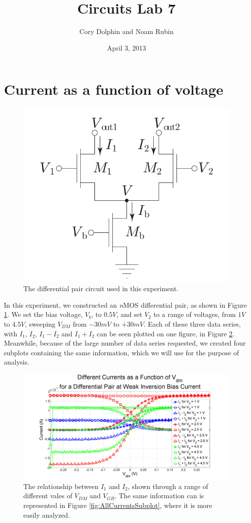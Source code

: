 \documentclass{article}
\title{Circuits Lab 7}
\author{Cory Dolphin and Noam Rubin}
\date{April 3, 2013}
\newcommand{\Vgb}{{$V_{GB}$}}
\newcommand{\Vb}{{$V_{b}$}}
\newcommand{\nMOS}{{\textit{n}MOS }}
\begin{document}
\maketitle

\section*{Current as a function of voltage}
\begin{figure}[H]
\centering
\includegraphics[width=0.65\linewidth]{./Figures/Schematic.png}
\caption{The differential pair circuit used in this experiment.}
\label{fig:Schematic}
\end{figure}

In this experiment, we constructed an \nMOS differential pair, as shown in Figure \ref{fig:Schematic}. We set the bias voltage, \Vb, to $0.5V$, and set $V_2$ to a range of voltages, from $1V$ to $4.5V$, sweeping $V_{DM}$ from $-30mV$ to $+30mV$. Each of these three data series, with $I_1$, $I_2$, $I_1 - I_2$ and $I_1 + I_2$ can be seen plotted on one figure, in Figure \ref{fig:AllCurrentsOneFigure}. Meanwhile, because of the large number of data series requested, we created four subplots containing the same information, which we will use for the purpose of analysis.
\begin{figure}[H]
\centering
\includegraphics[width=\linewidth]{./Figures/AllCurrentsOneFigure}
\caption{The relationship between $I_1$ and $I_2$, shown through a range of different vales of $V_{DM}$ and \Vgb. The same information can is represented in Figure \ref{fig:AllCurrentsSubplot}, where it is more easily analyzed. }
\label{fig:AllCurrentsOneFigure}
\end{figure}
\end{document}
